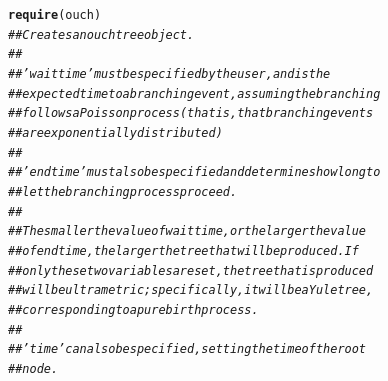 \documentclass[12pt,reqno,final]{amsart}\usepackage[]{graphicx}\usepackage[]{color}
\makeatletter
\newcommand{\hlcom}[1]{\textcolor[rgb]{0.678,0.584,0.686}{\textit{#1}}}%
\newcommand{\hlstd}[1]{\textcolor[rgb]{0.345,0.345,0.345}{#1}}%
\newcommand{\hlkwd}[1]{\textcolor[rgb]{0.737,0.353,0.396}{\textbf{#1}}}%
\newenvironment{kframe}{%
 \def\at@end@of@kframe{}%
 \ifinner\ifhmode%
  \def\at@end@of@kframe{\end{minipage}}%
  \begin{minipage}{\columnwidth}%
 \fi\fi%
 \def\FrameCommand##1{\hskip\@totalleftmargin \hskip-\fboxsep
 \colorbox{shadecolor}{##1}\hskip-\fboxsep
     \hskip-\linewidth \hskip-\@totalleftmargin \hskip\columnwidth}%
 \MakeFramed {\advance\hsize-\width
   \@totalleftmargin\z@ \linewidth\hsize
   \@setminipage}}%
 {\par\unskip\endMakeFramed%
 \at@end@of@kframe}
\newenvironment{knitrout}{}{} %
\theoremstyle{plain}
\numberwithin{equation}{part}
\makeatother
\begin{document}
\begin{knitrout}
\color{fgcolor}\begin{kframe}
\begin{alltt}
\hlkwd{require}\hlstd{(ouch)}
\hlcom{## Creates an ouchtree object.}
\hlcom{##}
\hlcom{## 'waittime' must be specified by the user, and is the}
\hlcom{## expected time to a branching event, assuming the branching}
\hlcom{## follows a Poisson process (that is, that branching events}
\hlcom{## are exponentially distributed)}
\hlcom{##}
\hlcom{## 'endtime' must also be specified and determines how long to}
\hlcom{## let the branching process proceed.}
\hlcom{##}
\hlcom{## The smaller the value of waittime, or the larger the value}
\hlcom{## of endtime, the larger the tree that will be produced. If}
\hlcom{## only these two variables are set, the tree that is produced}
\hlcom{## will be ultrametric; specifically, it will be a Yule tree,}
\hlcom{## corresponding to a pure birth process.}
\hlcom{##}
\hlcom{## 'time' can also be specified, setting the time of the root}
\hlcom{## node.}


\end{alltt}
\end{kframe}
\end{knitrout}
\end{document}
